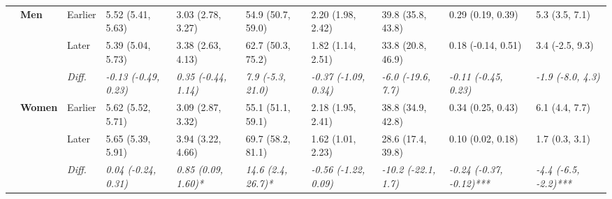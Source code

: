 \documentclass[12pt, a4paper]{article}
\begin{document}
\begin{appendices}
\begin{table}[!p]
{\begin{tabular}[t]{>{}l>{}lllllllll}
        \cmidrule{2-10}
                                              & \multirow{3}{*}{\textbf{Men}}     & Earlier                       & 5.52 (5.41, 5.63)                           & 3.03 (2.78, 3.27)                            & 54.9 (50.7, 59.0)                           & 2.20 (1.98, 2.42)                           & 39.8 (35.8, 43.8)                          & 0.29 (0.19, 0.39)                               & 5.3 (3.5, 7.1)                                \\
        \cmidrule{3-10}
                                              &                                   & Later                         & 5.39 (5.04, 5.73)                           & 3.38 (2.63, 4.13)                            & 62.7 (50.3, 75.2)                           & 1.82 (1.14, 2.51)                           & 33.8 (20.8, 46.9)                          & 0.18 (-0.14, 0.51)                              & 3.4 (-2.5, 9.3)                               \\
        \cmidrule{3-10}
                                              &                                   & \cellcolor{gray!10}\em{Diff.} & \cellcolor{gray!10}\em{-0.13 (-0.49, 0.23)} & \cellcolor{gray!10}\em{0.35 (-0.44, 1.14)}   & \cellcolor{gray!10}\em{7.9 (-5.3, 21.0)}    & \cellcolor{gray!10}\em{-0.37 (-1.09, 0.34)} & \cellcolor{gray!10}\em{-6.0 (-19.6, 7.7)}  & \cellcolor{gray!10}\em{-0.11 (-0.45, 0.23)}     & \cellcolor{gray!10}\em{-1.9 (-8.0, 4.3)}      \\
        \cmidrule{2-10}
                                              & \multirow{3}{*}{\textbf{Women}}   & Earlier                       & 5.62 (5.52, 5.71)                           & 3.09 (2.87, 3.32)                            & 55.1 (51.1, 59.1)                           & 2.18 (1.95, 2.41)                           & 38.8 (34.9, 42.8)                          & 0.34 (0.25, 0.43)                               & 6.1 (4.4, 7.7)                                \\
        \cmidrule{3-10}
                                              &                                   & Later                         & 5.65 (5.39, 5.91)                           & 3.94 (3.22, 4.66)                            & 69.7 (58.2, 81.1)                           & 1.62 (1.01, 2.23)                           & 28.6 (17.4, 39.8)                          & 0.10 (0.02, 0.18)                               & 1.7 (0.3, 3.1)                                \\
        \cmidrule{3-10}
                                              &                                   & \cellcolor{gray!10}\em{Diff.} & \cellcolor{gray!10}\em{0.04 (-0.24, 0.31)}  & \cellcolor{gray!10}\em{0.85 (0.09, 1.60)*}   & \cellcolor{gray!10}\em{14.6 (2.4, 26.7)*}   & \cellcolor{gray!10}\em{-0.56 (-1.22, 0.09)} & \cellcolor{gray!10}\em{-10.2 (-22.1, 1.7)} & \cellcolor{gray!10}\em{-0.24 (-0.37, -0.12)***} & \cellcolor{gray!10}\em{-4.4 (-6.5, -2.2)***}  \\

\end{tabular}}
\end{table}
\end{appendices}
\end{document}
